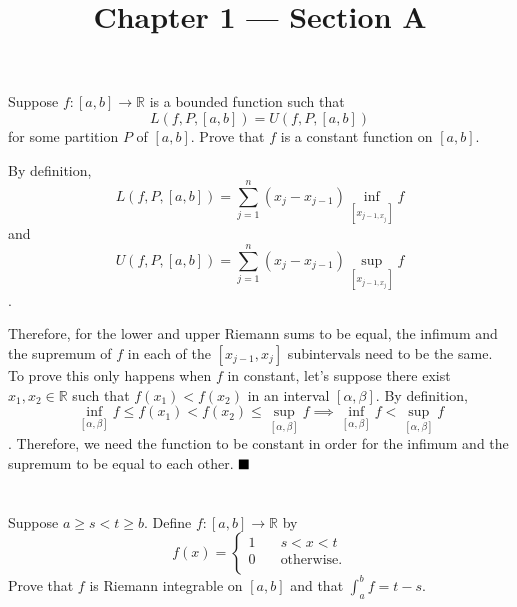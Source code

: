 \documentclass[11pt, a4paper, tikz]{article}
\newcommand{\newpara}{
	\vskip 2mm
}
\newcommand{\centsection}[1]{
	\section*{\centering{#1}}
}
\renewcommand{\qed}{\hfill\blacksquare}
\newcommand{\reals}{
	\ensuremath{\mathbb{R}}
}
\begin{document}
	\title{\textbf{Chapter 1 — Section A}}
	\maketitle
	\centsection{Exercise 1}
	
	\begin{formulationBox}
		Suppose $f:[a,b]\rightarrow\reals$ is a bounded function such that \[L(f,P,[a,b]) = U(f,P,[a,b])\] for some partition $P$ of $[a,b]$. Prove that $f$ is a constant function on $[a,b]$.
	\end{formulationBox}
	
	By definition,
	\begin{equation*}
		L(f, P, [a, b]) = \sum_{j=1}^{n}(x_j-x_{j-1})\inf_{[x_{j-1,x_j}]}f
	\end{equation*}
	and
		\begin{equation*}
		U(f, P, [a, b]) = \sum_{j=1}^{n}(x_j-x_{j-1})\sup_{[x_{j-1,x_j}]}f
	\end{equation*}
	.
	\newpara
	Therefore, for the lower and upper Riemann sums to be equal, the infimum and the supremum of $f$ in each of the $[x_{j-1},x_j]$ subintervals need to be the same. To prove this only happens when $f$ in constant, let's suppose there exist $x_1, x_2\in\reals$ such that $f(x_1) < f(x_2)$ in an interval $[\alpha,\beta]$. By definition,
	\begin{equation*}
		\inf_{[\alpha,\beta]}f \leq f(x_1) < f(x_2) \leq  \sup_{[\alpha,\beta]}f \implies \inf_{[\alpha,\beta]}f < \sup_{[\alpha,\beta]}f
	\end{equation*}. Therefore, we need the function to be constant in order for the infimum and the supremum to be equal to each other.
	$\qed$
	
	\centsection{Exercise 2}
	
	\begin{formulationBox}
		Suppose $a\geq s<t\geq b$. Define $f:[a,b]\rightarrow\reals$ by
		\[
			f(x) =
			\begin{cases}
				1 &\quad s<x<t\\
				0 &\quad \textrm{otherwise.}\\ 
			\end{cases}
		\]
		Prove that $f$ is Riemann integrable on $[a,b]$ and that $\int_a^bf=t-s$.
	\end{formulationBox}
	
\end{document}
